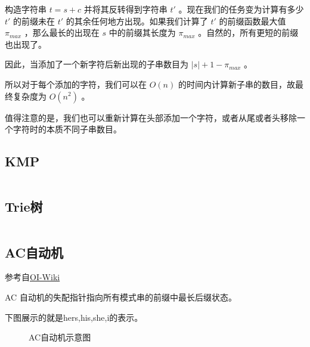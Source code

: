 \documentclass[a4paper,11pt]{article}
\begin{document}
构造字符串 \(t=s+c\) 并将其反转得到字符串 \(t'\)
。现在我们的任务变为计算有多少 \(t'\) 的前缀未在 \(t'\)
的其余任何地方出现。如果我们计算了 \(t'\) 的前缀函数最大值 \(\pi_{max}\)
，那么最长的出现在 \(s\) 中的前缀其长度为 \(\pi_{max}\)
。自然的，所有更短的前缀也出现了。

因此，当添加了一个新字符后新出现的子串数目为 \(|s|+1-\pi_{max}\) 。

所以对于每个添加的字符，我们可以在 \(O(n)\)
的时间内计算新子串的数目，故最终复杂度为 \(O(n^2)\) 。

值得注意的是，我们也可以重新计算在头部添加一个字符，或者从尾或者头移除一个字符时的本质不同子串数目。
\subsection{KMP}
\inputminted[linenos]{c++}{string/kmp.cpp}
\subsection{Trie树}
\inputminted[linenos]{c++}{string/trie.cpp}
\subsection{AC自动机}
参考自\href{https://oi-wiki.org/string/ac-automaton/}{OI-Wiki}

AC 自动机的失配指针指向所有模式串的前缀中最长后缀状态。

下图展示的就是hers,his,she,i的表示。

\begin{figure}[htb] 
\caption{\label{1} AC自动机示意图} 
\end{figure}
\end{document}
